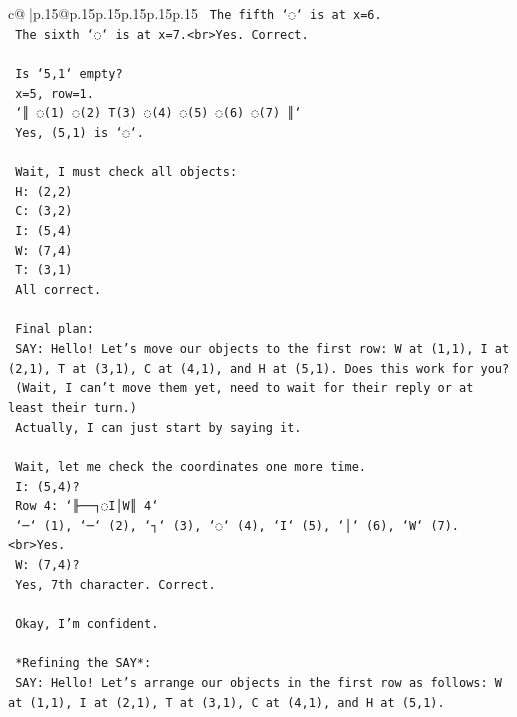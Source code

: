 \documentclass{article}
\begin{document}
{\begin{supertabular}{c@{$\;$}|p{.15\linewidth}@{}p{.15\linewidth}p{.15\linewidth}p{.15\linewidth}p{.15\linewidth}p{.15\linewidth}}
{{{\texttt{    The fifth `◌` is at x=6.} \\
\texttt{    The sixth `◌` is at x=7.<br>Yes. Correct.} \\
\\ 
\texttt{    Is `5,1` empty?} \\
\texttt{    x=5, row=1.} \\
\texttt{    `║ ◌(1) ◌(2) T(3) ◌(4) ◌(5) ◌(6) ◌(7) ║`} \\
\texttt{    Yes, (5,1) is `◌`.} \\
\\ 
\texttt{    Wait, I must check all objects:} \\
\texttt{    H: (2,2)} \\
\texttt{    C: (3,2)} \\
\texttt{    I: (5,4)} \\
\texttt{    W: (7,4)} \\
\texttt{    T: (3,1)} \\
\texttt{    All correct.} \\
\\ 
\texttt{    Final plan:} \\
\texttt{    SAY: Hello! Let's move our objects to the first row: W at (1,1), I at (2,1), T at (3,1), C at (4,1), and H at (5,1). Does this work for you?} \\
\texttt{    (Wait, I can't move them yet, need to wait for their reply or at least their turn.)} \\
\texttt{    Actually, I can just start by saying it.} \\
\\ 
\texttt{    Wait, let me check the coordinates one more time.} \\
\texttt{    I: (5,4)?} \\
\texttt{    Row 4: `╟──┐◌I│W║ 4`} \\
\texttt{    `─` (1), `─` (2), `┐` (3), `◌` (4), `I` (5), `│` (6), `W` (7).<br>Yes.} \\
\texttt{    W: (7,4)?} \\
\texttt{    Yes, 7th character. Correct.} \\
\\ 
\texttt{    Okay, I'm confident.} \\
\\ 
\texttt{    *Refining the SAY*:} \\
\texttt{    SAY: Hello! Let's arrange our objects in the first row as follows: W at (1,1), I at (2,1), T at (3,1), C at (4,1), and H at (5,1).} \\
}}}
\end{supertabular}}
\end{document}

